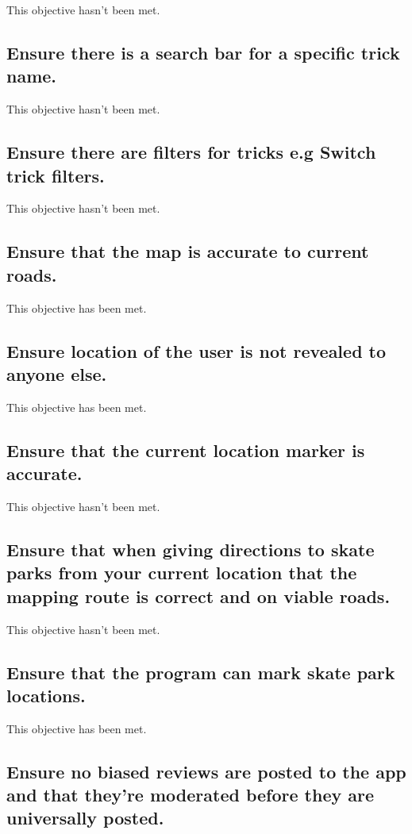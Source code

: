 This objective hasn't been met.

\subsection {Ensure there is a search bar for a specific trick name.}

This objective hasn't been met.

\subsection {Ensure there are filters for tricks e.g Switch trick filters.}

This objective hasn't been met.



\subsection {Ensure that the map is accurate to current roads.}

This objective has been met.

\subsection {Ensure location of the user is not revealed to anyone else.}

This objective has been met.

\subsection {Ensure that the current location marker is accurate.}

This objective hasn't been met.

\subsection {Ensure that when giving directions to skate parks from your current location that the mapping route is correct and on viable roads. }

This objective hasn't been met.

\subsection {Ensure that the program can mark skate park locations.}

This objective has been met.


\subsection {Ensure no biased reviews are posted to the app and that they're moderated before they are universally posted.}

